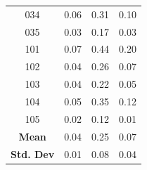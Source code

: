 \documentclass[12pt]{article}
\begin{document}
\begin{table}[!h]
\begin{tabular}{c | c c c}
	034 &   0.06 &     0.31 &       0.10 \\
	035 &   0.03 &     0.17 &       0.03 \\
	101 &   0.07 &     0.44 &       0.20 \\
	102 &   0.04 &     0.26 &       0.07 \\
	103 &   0.04 &     0.22 &       0.05 \\
	104 &   0.05 &     0.35 &       0.12 \\
	105 &   0.02 &     0.12 &       0.01 \\
	\bottomrule
	\textbf{Mean} & 0.04 & 0.25 & 0.07 \\
	\textbf{Std. Dev} & 0.01 & 0.08 & 0.04 \\
\end{tabular}
\label{tab:1}
\end{table}
\end{document}
